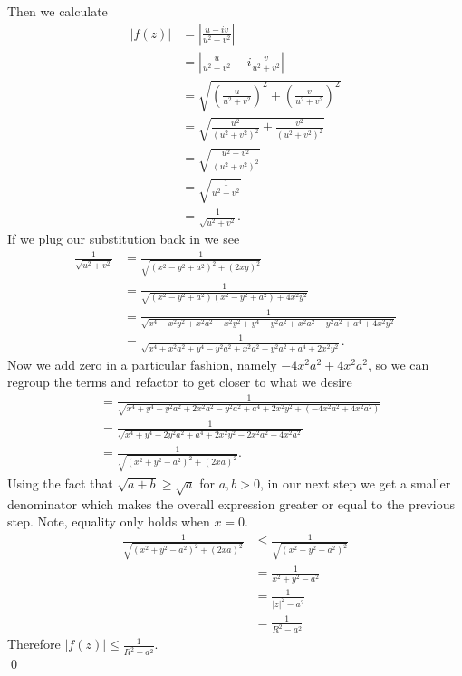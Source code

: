 \documentclass[10pt]{amsart}
\theoremstyle{nonumberplain}
\begin{document}
\begin{enumerate}[label={\bf {\arabic*}:}]
$$$$
Then we calculate
\begin{align*}
\left| f(z) \right| &= \left| \frac{u - iv }{u^2 + v^2 } \right| \\
	&= \left| \frac{u }{u^2 + v^2 } - i\frac{v}{u^2 + v^2 } \right| \\
	&= \sqrt{
		\left(\frac{u }{u^2 + v^2 }\right)^2 + \left(\frac{v }{u^2 + v^2 }\right)^2
	} \\
	&= \sqrt{
		\frac{u^2 }{\left( u^2 + v^2 \right)^2} + \frac{v^2 }{\left( u^2 + v^2 \right)^2}
	} \\
	&= \sqrt{
		\frac{u^2 + v^2 }{\left( u^2 + v^2 \right)^2}
	} \\
	&= \sqrt{
		\frac{1}{u^2 + v^2}
	} \\
	&= \frac{1}{\sqrt{u^2 + v^2}}.
\end{align*}
If we plug our substitution back in we see
\begin{align*}
\frac{1}{\sqrt{u^2 + v^2}} &= \frac{1}{\sqrt{\left(x^2 - y^2 + a^2 \right)^2 + \left(2xy \right)^2}} \\
	&= \frac{1}{\sqrt{\left(x^2 - y^2 + a^2 \right)\left(x^2 - y^2 + a^2 \right) + 4x^2y^2}} \\
	&= \frac{1}{
		\sqrt{
			x^4 - x^2y^2 + x^2a^2 -x^2y^2 + y^4 - y^2a^2 + x^2a^2 - y^2a^2 + a^4 + 4x^2y^2
		}
	} \\
	&= \frac{1}{
		\sqrt{
			x^4 + x^2a^2 + y^4 - y^2a^2 + x^2a^2 - y^2a^2 + a^4 + 2x^2y^2
		}
	}.
\end{align*}
Now we add zero in a particular fashion, namely $- 4x^2a^2 + 4x^2a^2 $, so we can regroup the terms and refactor to get closer to what we desire
\begin{align*}
	&= \frac{1}{
		\sqrt{
			x^4 + y^4 - y^2a^2 + 2x^2a^2 - y^2a^2 + a^4 + 2x^2y^2 +\left( - 4x^2a^2 + 4x^2a^2 \right)
		}
	} \\
	&= \frac{1}{
		\sqrt{
			x^4 + y^4 - 2y^2a^2 + a^4 + 2x^2y^2 - 2x^2a^2 + 4x^2a^2
		}
	} \\
	&= \frac{1}{\sqrt{\left(x^2 + y^2 - a^2\right)^2 + \left(2xa\right)^2}}.
\end{align*}
Using the fact that $\sqrt{a + b} \geq \sqrt{a}$ for $a, b > 0$, in our next step we get a smaller denominator which makes the overall expression greater or equal to the previous step. Note, equality only holds when $x=0$.
\begin{align*}
 \frac{1}{\sqrt{\left(x^2 + y^2 - a^2\right)^2 + \left(2xa\right)^2}}
 	&\leq \frac{1}{\sqrt{\left(x^2 + y^2 - a^2\right)^2}} \\
	&= \frac{1}{x^2 + y^2 - a^2} \\
	&= \frac{1}{|z|^2 - a^2} \\
	&= \frac{1}{R^2 - a^2}
\end{align*}
Therefore $\left| f(z) \right| \leq \frac{1}{R^2 - a^2}$. \\
\qed


\end{enumerate}
\end{document}
